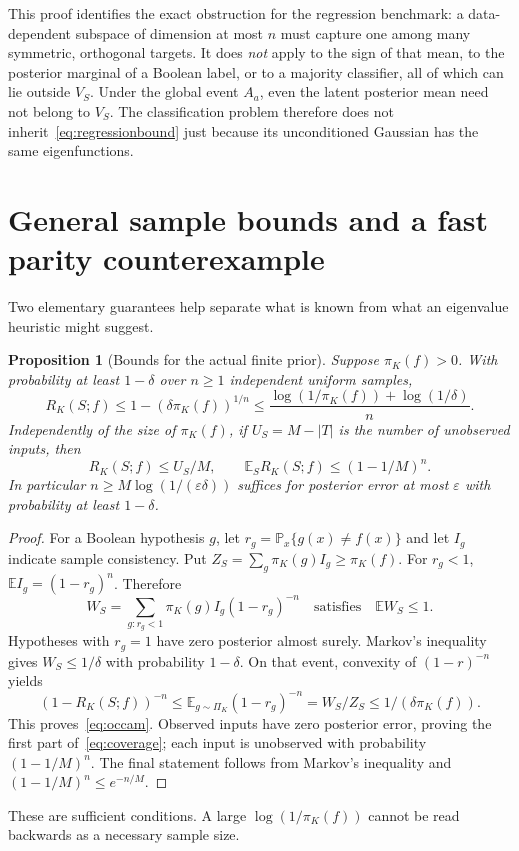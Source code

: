 \documentclass[11pt]{article}
\newtheorem{proposition}[theorem]{Proposition}
\theoremstyle{remark}\newtheorem{remark}[theorem]{Remark}
\newcommand{\E}{\mathbb E}
\newcommand{\PP}{\mathbb P}
\begin{document}
This proof identifies the exact obstruction for the regression benchmark: a data-dependent subspace of dimension at most $n$ must capture one among many symmetric, orthogonal targets. It does \emph{not} apply to the sign of that mean, to the posterior marginal of a Boolean label, or to a majority classifier, all of which can lie outside $V_S$. Under the global event $A_a$, even the latent posterior mean need not belong to $V_S$. The classification problem therefore does not inherit~\eqref{eq:regressionbound} just because its unconditioned Gaussian has the same eigenfunctions.

\section{General sample bounds and a fast parity counterexample}\label{sec:fast}
Two elementary guarantees help separate what is known from what an eigenvalue heuristic might suggest.

\begin{proposition}[Bounds for the actual finite prior]\label{prop:upper}
Suppose $\pi_K(f)>0$. With probability at least $1-\delta$ over $n\ge1$ independent uniform samples,
\begin{equation}\label{eq:occam}
 R_K(S;f)\le 1-(\delta\pi_K(f))^{1/n}
 \le\frac{\log(1/\pi_K(f))+\log(1/\delta)}{n}.
\end{equation}
Independently of the size of $\pi_K(f)$, if $U_S=M-|T|$ is the number of unobserved inputs, then
\begin{equation}\label{eq:coverage}
 R_K(S;f)\le U_S/M,
 \qquad \E_S R_K(S;f)\le(1-1/M)^n.
\end{equation}
In particular $n\ge M\log(1/(\varepsilon\delta))$ suffices for posterior error at most $\varepsilon$ with probability at least $1-\delta$.
\end{proposition}
\begin{proof}
For a Boolean hypothesis $g$, let $r_g=\PP_x\{g(x)\ne f(x)\}$ and let $I_g$ indicate sample consistency. Put $Z_S=\sum_g\pi_K(g)I_g\ge\pi_K(f)$. For $r_g<1$, $\E I_g=(1-r_g)^n$. Therefore
\[
 W_S=\sum_{g:r_g<1}\pi_K(g)I_g(1-r_g)^{-n}
 \quad\text{satisfies}\quad \E W_S\le1.
\]
Hypotheses with $r_g=1$ have zero posterior almost surely. Markov's inequality gives $W_S\le1/\delta$ with probability $1-\delta$. On that event, convexity of $(1-r)^{-n}$ yields
\[
 (1-R_K(S;f))^{-n}\le \E_{g\sim\Pi_K}(1-r_g)^{-n}
 =W_S/Z_S\le1/(\delta\pi_K(f)).
\]
This proves~\eqref{eq:occam}. Observed inputs have zero posterior error, proving the first part of~\eqref{eq:coverage}; each input is unobserved with probability $(1-1/M)^n$. The final statement follows from Markov's inequality and $(1-1/M)^n\le e^{-n/M}$.
\end{proof}
These are sufficient conditions. A large $\log(1/\pi_K(f))$ cannot be read backwards as a necessary sample size.
\end{document}
